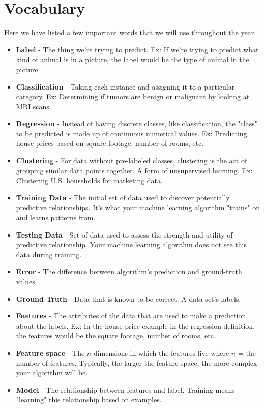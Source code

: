 \documentclass{article}
\begin{document}
\section{Vocabulary}

Here we have listed a few important words that we will use throughout the year.

\begin{itemize}
    \item \textbf{Label} - The thing we're trying to predict. Ex: If we're trying to predict what kind of animal is in a picture, the label would be the type of animal in the picture.
    \item \textbf{Classification} - Taking each instance and assigning it to a particular category. Ex: Determining if tumors are benign or malignant by looking at MRI scans.
    \item \textbf{Regression} - Instead of having discrete classes, like classification, the "class" to be predicted is made up of continuous numerical values. Ex: Predicting house prices based on square footage, number of rooms, etc.
    \item \textbf{Clustering} - For data without pre-labeled classes, clustering is the act of grouping similar data points together. A form of unsupervised learning. Ex: Clustering U.S. households for marketing data.
    \item \textbf{Training Data} - The initial set of data used to discover potentially predictive relationships. It's what your machine learning algorithm "trains" on and learns patterns from.
    \item \textbf{Testing Data} - Set of data used to assess the strength and utility of predictive relationship. Your machine learning algorithm does not see this data during training.
    \item \textbf{Error} - The difference between algorithm's prediction and ground-truth values.
    \item \textbf{Ground Truth} - Data that is known to be correct. A data-set's labels.
    \item \textbf{Features} - The attributes of the data that are used to make a prediction about the labels. Ex: In the house price example in the regression definition, the features would be the square footage, number of rooms, etc.
    \item \textbf{Feature space} - The $n$-dimensions in which the features live where $n$ = the number of features. Typically, the larger the feature space, the more complex your algorithm will be.
    \item \textbf{Model} - The relationship between features and label. Training means "learning" this relationship based on examples.
\end{itemize}
\end{document}
